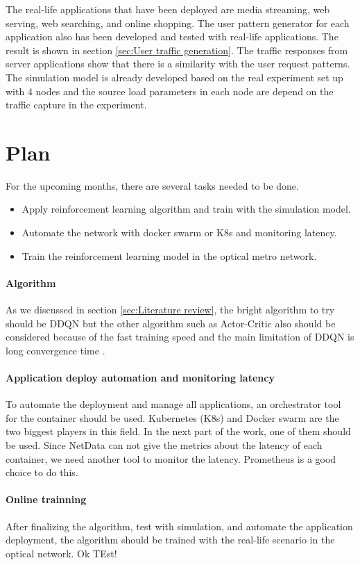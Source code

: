 \documentclass[conference]{IEEEtran}
\begin{document}
The real-life applications that have been deployed are media streaming, web serving, web searching, and online shopping. The user pattern generator for each application also has been developed and tested with real-life applications. The result is shown in section \ref{sec:User traffic generation}. The traffic responses from server applications show that there is a similarity with the user request patterns. The simulation model is already developed based on the real experiment set up with 4 nodes and the source load parameters in each node are depend on the traffic capture in the experiment.



\section{Plan}
\label{sec:Plan}
For the upcoming months, there are several tasks needed to be done.
\begin{itemize}
    \item Apply reinforcement learning algorithm and train with the simulation model.
    \item Automate the network with docker swarm or K8s and monitoring latency.
    \item Train the reinforcement learning model in the optical metro network.
\end{itemize}

\paragraph{Algorithm}
As we discussed in section \ref{sec:Literature review}, the bright algorithm to try should be DDQN but the other algorithm such as Actor-Critic also should be considered because of the fast training speed and the main limitation of DDQN is long convergence time \cite{article}. 

\paragraph{Application deploy automation and monitoring latency}
To automate the deployment and manage all applications, an orchestrator tool for the container should be used. Kubernetes (K8s) and Docker swarm are the two biggest players in this field. In the next part of the work, one of them should be used. Since NetData can not give the metrics about the latency of each container, we need another tool to monitor the latency. Prometheus is a good choice to do this. 

\paragraph{Online trainning}
After finalizing the algorithm, test with simulation, and automate the application deployment, the algorithm should be trained with the real-life scenario in the optical network. 
Ok TEst!




\end{document}
